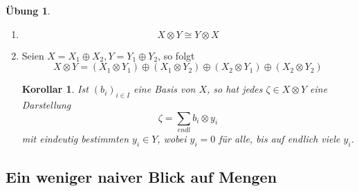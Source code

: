 \documentclass[12pt,a4paper]{article}
\newtheorem{corollary}[theorem]{Korollar}
\theoremstyle{definition}
\newtheorem*{exercise}{Übung}
\theoremstyle{remark}
\begin{document}
		\begin{exercise}
			\begin{enumerate}
				\item 
					\begin{equation}
						X \otimes Y \cong Y \otimes X
					\end{equation}
				\item 
					Seien $X = X_1 \oplus X_2, Y = Y_1 \oplus Y_2$, so folgt
					\begin{equation}
						X \otimes Y = \left( X_1 \otimes Y_1 \right) \oplus \left( X_1 \otimes Y_2 \right) \oplus \left( X_2 \otimes Y_1 \right) \oplus \left( X_2 \otimes Y_2 \right)
					\end{equation}
					\begin{corollary}
												
						Ist $(b_i)_{i \in I}$ eine Basis von $X$, so hat jedes $\zeta \in X \otimes Y$ eine Darstellung
						\begin{equation}
							\zeta = \sum_{endl} b_i \otimes y_i
						\end{equation}
						mit eindeutig bestimmten $y_i \in Y$, wobei $y_i=0$ für alle, bis auf endlich viele $y_i$.
					\end{corollary}
			\end{enumerate}
		\end{exercise}
		
		\newpage		
		
		\subsection{Ein weniger naiver Blick auf Mengen}
		
\end{document}
